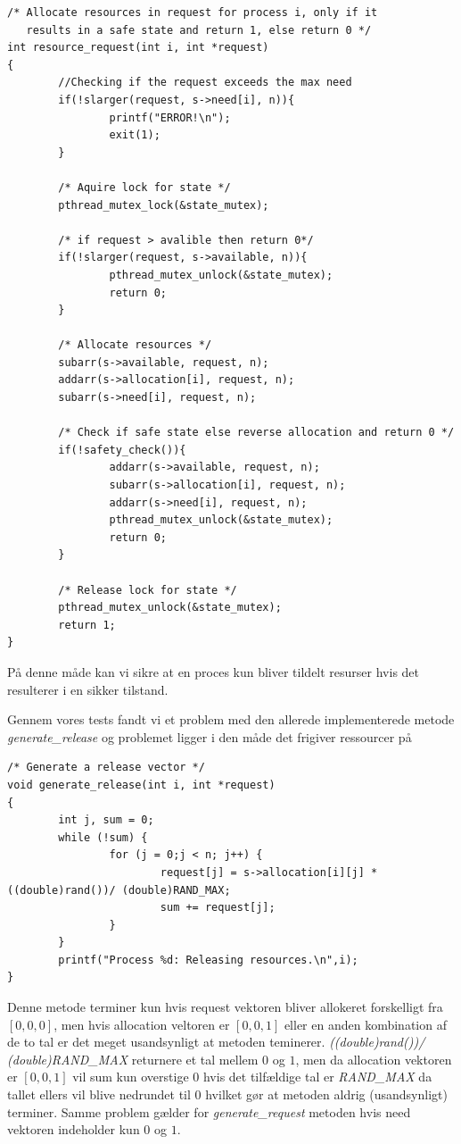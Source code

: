 \documentclass[danish]{report}
\begin{document}
\begin{lstlisting}
/* Allocate resources in request for process i, only if it
   results in a safe state and return 1, else return 0 */
int resource_request(int i, int *request)
{
        //Checking if the request exceeds the max need
        if(!slarger(request, s->need[i], n)){
                printf("ERROR!\n");
                exit(1);
        }

        /* Aquire lock for state */
        pthread_mutex_lock(&state_mutex);

        /* if request > avalible then return 0*/
        if(!slarger(request, s->available, n)){
                pthread_mutex_unlock(&state_mutex);
                return 0;
        }

        /* Allocate resources */
        subarr(s->available, request, n);
        addarr(s->allocation[i], request, n);
        subarr(s->need[i], request, n);

        /* Check if safe state else reverse allocation and return 0 */
        if(!safety_check()){
                addarr(s->available, request, n);
                subarr(s->allocation[i], request, n);
                addarr(s->need[i], request, n);
                pthread_mutex_unlock(&state_mutex);
                return 0;
        }

        /* Release lock for state */
        pthread_mutex_unlock(&state_mutex);
        return 1;
}
\end{lstlisting}

På denne måde kan vi sikre at en proces kun bliver tildelt resurser hvis det resulterer i en sikker tilstand.

Gennem vores tests fandt vi et problem med den allerede implementerede metode \textit{generate\_release} og problemet ligger i den måde det frigiver ressourcer på

\begin{lstlisting}
/* Generate a release vector */
void generate_release(int i, int *request)
{
        int j, sum = 0;
        while (!sum) {
                for (j = 0;j < n; j++) {
                        request[j] = s->allocation[i][j] * ((double)rand())/ (double)RAND_MAX;
                        sum += request[j];
                }
        }
        printf("Process %d: Releasing resources.\n",i);
}
\end{lstlisting}

Denne metode terminer kun hvis request vektoren bliver allokeret forskelligt fra $[0,0,0]$, men hvis allocation veltoren er $[0,0,1]$ eller en anden kombination af de to tal er det meget usandsynligt at metoden teminerer. \textit{((double)rand())/ (double)RAND\_MAX} returnere et tal mellem $0$ og $1$, men da allocation vektoren er $[0,0,1]$ vil sum kun overstige $0$ hvis det tilfældige tal er \textit{RAND\_MAX} da tallet ellers vil blive nedrundet til $0$ hvilket gør at metoden aldrig (usandsynligt) terminer. Samme problem gælder for \textit{generate\_request} metoden hvis need vektoren indeholder kun $0$ og $1$.
\end{document}
